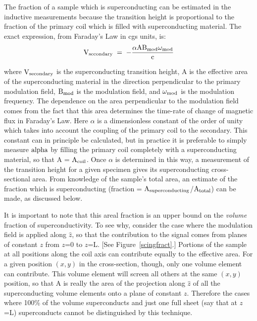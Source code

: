 	The fraction of a sample which is  superconducting can be estimated
in the inductive measurements because the transition height is proportional
to the fraction  of the primary coil which  is  filled with superconducting
material.  The exact expression, from Faraday's Law in cgs units, is:\\

\begin{equation}
\rm V_{secondary} \; = \; -\frac{\alpha A B_{mod} \omega_{mod}}{c}
\label{vbridge}
\end{equation}

\noindent where $\rm V_{secondary}$ is the superconducting transition
height,  A is the  effective area of   the  superconducting material in the
direction perpendicular to the  primary  modulation field, $\rm B_{mod}$ is
the  modulation field, and  $\rm \omega_{mod}$ is the modulation frequency.
The dependence on the area perpendicular to the modulation field comes from
the fact that this area determines the time-rate of change of magnetic flux
in Faraday's Law.   Here $\alpha$ is a  dimensionless constant of the order
of unity which takes into account the  coupling of the  primary coil to the
secondary.  This constant can in principle  be calculated\cite{abel64}, but
in practice it is preferable to simply measure  $\rm alpha$  by filling the
primary coil completely with a superconducting material, so that  A  = $\rm
A_{coil}$.  Once $\alpha$  is determined in this  way, a measurement of the
transition   height for a    given   specimen  gives   its  superconducting
cross-sectional area.  From   knowledge of  the  sample's total    area, an
estimate   of the   fraction which  is   superconducting  (fraction =  $\rm
A_{superconducting}$/$\rm A_{total}$) can be made, as discussed below.

	It is important to note that this  areal fraction is an upper bound
on  the {\em volume} fraction  of superconductivity.  To  see why, consider
the case where the modulation field is applied along $\hat{z}$, so that the
contribution to the signal comes from planes of constant $z$ from $z$=0 to $z$=L.
[See Figure~\ref{scingfract}.]  Portions  of the  sample  at  all positions
along the coil axis can contribute  equally  to the effective  area.  For a
given position  $(x,y)$  in the  cross-section,  though,  only  one  volume
element can contribute.  This volume element  will screen all others at the
same $(x,y)$ position, so that A is really the area of the projection along
$\hat{z}$ of   all the superconducting   volume  elements  onto a  plane of
constant $z$. Therefore  the cases where 100\%  of the volume superconducts
and just one full sheet (say  that  at  $z$=L)  superconducts cannot be
distinguished by this technique.


